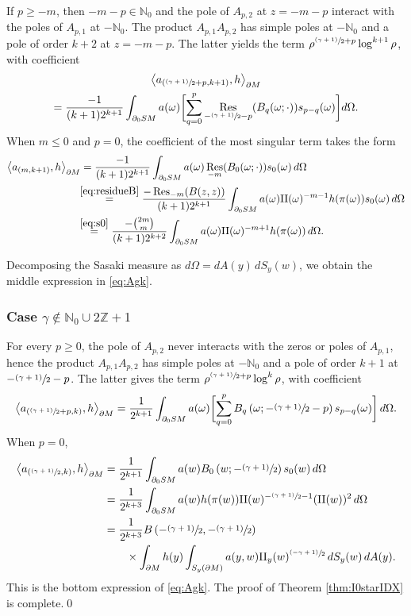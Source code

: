 \documentclass[JEP,XML,SOM,Unicode,NoFloatCountersInSection, NoEqCountersInSection,published]{cedram}
\newcommand{\psfrac}[2]{\sfrac{(#1)}{#2}}
\DeclareMathOperator{\Res}{Res}
\theoremstyle{plain}
\theoremstyle{definition}
\theoremstyle{remark}
\def\Nm{{\mathbb{N}}}
\def\Zm{{\mathbb{Z}}}
\def\two{\mathrm{II}}
\begin{document}
If $p\ge -m$, then $-m-p\in \Nm_0$ and the pole of $A_{p,2}$ at $z = -m-p$ interact with the poles of $A_{p,1}$ at $-\Nm_0$. The product $A_{p,1} A_{p,2}$ has simple poles at $-\Nm_0$ and a pole of order $k+2$ at $z = -m-p$.
The latter yields the term $\rho^{\psfrac{\gamma+1}{2}+p} \log^{k+1} \rho$, with coefficient
\begin{multline*}
\left\langle a_{(\psfrac{\gamma+1}{2}+p, k+1)}, h\right\rangle_{\partial M}\\
= \frac{-1}{(k+1) 2^{k+1}} \int_{\partial_0 SM} a(\omega) \biggl[\sum_{q=0}^p \Res_{- \psfrac{\gamma+1}{2} - p} (B_q(\omega; \cdot)) s_{p-q}(\omega) \biggr] d\Omega.
\end{multline*}
When $m\le 0$ and $p=0$, the coefficient of the most singular term takes the form
\begin{align*}
\left\langle a_{(m, k+1)}, h\right\rangle_{\partial M} &= \frac{-1}{(k+1) 2^{k+1}} \int_{\partial_0 SM} a(\omega) \Res_{-m}(B_0(\omega; \cdot)) s_{0}(\omega)\,d\Omega \\
&\!\!\stackrel{\eqref{eq:residueB}}{=} \frac{-\Res_{-m}(B(z,z))}{(k+1) 2^{k+1}} \int_{\partial_0 SM} a(\omega) \two(\omega)^{-m-1} h(\pi(\omega)) s_{0}(\omega)\,d\Omega \\
&\!\!\stackrel{\eqref{eq:s0}}{=} \frac{-\binom{2m}{m}}{(k+1) 2^{k+2}} \int_{\partial_0 SM} a(\omega) \two(\omega)^{-m+1} h(\pi(\omega))\,d\Omega.
\end{align*}

Decomposing the Sasaki measure as $d\Omega = dA(y)\,dS_y(w)$, we obtain the middle expression in \eqref{eq:Agk}.

\subsubsection*{Case $\gamma\notin \Nm_0\cup 2\Zm +1$}
For every $p\ge 0$, the pole of $A_{p,2}$ never interacts with the zeros or poles of $A_{p,1}$, hence the product $A_{p,1} A_{p,2}$ has simple poles at $-\Nm_0$ and a pole of order $k+1$ at
$-\sfrac{(\gamma+1)}{2}-p$. The latter gives the term $\rho^{\psfrac{\gamma+1}{2}+p} \log^{k} \rho$, with coefficient
\[
\left\langle a_{(\psfrac{\gamma+1}{2}+p,k)}, h\right\rangle_{\partial M} = \frac{1}{2^{k+1}} \int_{\partial_0 SM} a(\omega) \biggl[\sum_{q=0}^{p} B_q\left(\omega; -\psfrac{\gamma+1}{2}-p\right) s_{p-q}(\omega) \biggr]\,d\Omega.
\]
When $p=0$,
\begin{align*}
\left\langle a_{(\psfrac{\gamma+1}{2},k)}, h \right\rangle_{\partial M} &= \frac{1}{2^{k+1}} \int_{\partial_0 SM} a(w) B_0 \left(w; -\psfrac{\gamma+1}{2}\right) s_0 (w)\,d\Omega \\
&= \frac{1}{2^{k+3}} \int_{\partial_0 SM} a(w) h(\pi(w)) \two(w)^{-\psfrac{\gamma+1}{2}-1} (\two(w))^2\,d\Omega \\
&= \frac{1}{2^{k+3}} B\left(-\psfrac{\gamma+1}{2}, -\psfrac{\gamma+1}{2} \right) \\
& \qquad \times \int_{\partial M} h(y) \int_{S_y (\partial M)} a(y,w) \two_y(w)^{\psfrac{-\gamma+1}{2}}\,dS_y(w)\,dA(y).
\end{align*}
This is the bottom expression of \eqref{eq:Agk}. The proof of Theorem \ref{thm:I0starIDX} is complete.\qed
\end{document}

